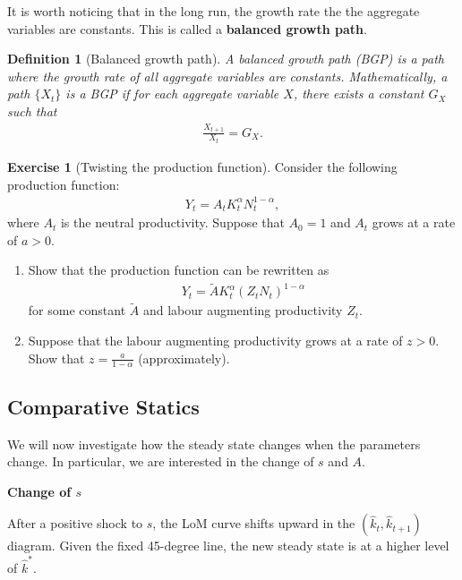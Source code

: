\documentclass{book}
\newtheorem{definition}{Definition}[chapter]
\theoremstyle{definition}
\newtheorem{exercise}{Exercise}[chapter]
\theoremstyle{plain}
\begin{document}
It is worth noticing that in the long run, the growth rate the the aggregate variables are constants. This is called a \textbf{balanced growth path}.

\begin{definition}[Balanced growth path]
    A balanced growth path (BGP) is a path where the growth rate of all aggregate variables are constants. Mathematically, a path $\{X_t\}$ is a BGP if for each aggregate variable $X$, there exists a constant $G_X$ such that
    \begin{align*}
        \frac{X_{t+1}}{X_t} = G_X.
    \end{align*}
\end{definition}

\begin{exercise}[Twisting the production function]
    Consider the following production function:
    \begin{align*}
        Y_t = A_t K_t^{\alpha} N_t^{1-\alpha},
    \end{align*}
    where $A_t$ is the neutral productivity. Suppose that $A_0 = 1$ and $A_t$ grows at a rate of $a>0$. 
    \begin{enumerate}[label=(\arabic*)]
        \item Show that the production function can be rewritten as
        \begin{align*}
            Y_t = \tilde{A} K_t^{\alpha} (Z_t N_t)^{1-\alpha}
        \end{align*}
        for some constant $\tilde{A}$ and labour augmenting productivity $Z_t$.
        \item Suppose that the labour augmenting productivity grows at a rate of $z>0$. Show that $z = \frac{a}{1-\alpha}$ (approximately).
    \end{enumerate}
\end{exercise}

\subsection{Comparative Statics}
We will now investigate how the steady state changes when the parameters change. In particular, we are interested in the change of $s$ and $A$. 

\medskip
\noindent \textbf{Change of $s$}

After a positive shock to $s$, the LoM curve shifts upward in the $(\hat{k}_t, \hat{k}_{t+1})$ diagram. Given the fixed 45-degree line, the new steady state is at a higher level of $\hat{k}^*$.
\end{document}
